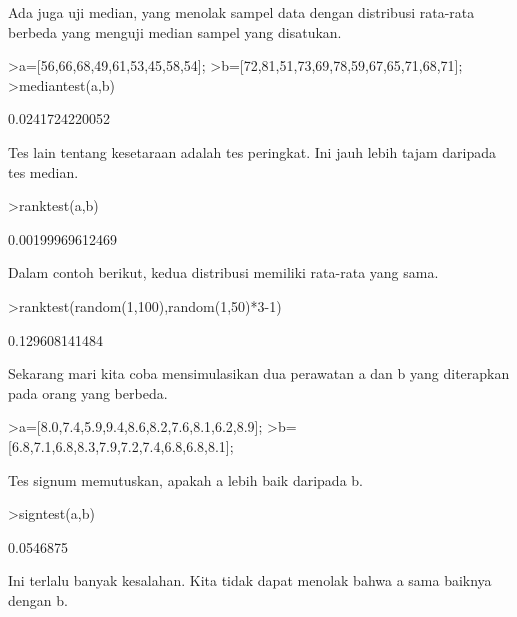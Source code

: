 \documentclass[a4paper,10pt]{article}
\begin{document}
\begin{eulernotebook}
\begin{eulercomment}
\begin{eulercomment}
\begin{eulercomment}
Ada juga uji median, yang menolak sampel data dengan distribusi
rata-rata berbeda yang menguji median sampel yang disatukan.
\end{eulercomment}
\begin{eulerprompt}
>a=[56,66,68,49,61,53,45,58,54];
>b=[72,81,51,73,69,78,59,67,65,71,68,71];
>mediantest(a,b)
\end{eulerprompt}
\begin{euleroutput}
  0.0241724220052
\end{euleroutput}
\begin{eulercomment}
Tes lain tentang kesetaraan adalah tes peringkat. Ini jauh lebih tajam
daripada tes median.
\end{eulercomment}
\begin{eulerprompt}
>ranktest(a,b)
\end{eulerprompt}
\begin{euleroutput}
  0.00199969612469
\end{euleroutput}
\begin{eulercomment}
Dalam contoh berikut, kedua distribusi memiliki rata-rata yang sama.
\end{eulercomment}
\begin{eulerprompt}
>ranktest(random(1,100),random(1,50)*3-1)
\end{eulerprompt}
\begin{euleroutput}
  0.129608141484
\end{euleroutput}
\begin{eulercomment}
Sekarang mari kita coba mensimulasikan dua perawatan a dan b yang
diterapkan pada orang yang berbeda.
\end{eulercomment}
\begin{eulerprompt}
>a=[8.0,7.4,5.9,9.4,8.6,8.2,7.6,8.1,6.2,8.9];
>b=[6.8,7.1,6.8,8.3,7.9,7.2,7.4,6.8,6.8,8.1];
\end{eulerprompt}
\begin{eulercomment}
Tes signum memutuskan, apakah a lebih baik daripada b.
\end{eulercomment}
\begin{eulerprompt}
>signtest(a,b)
\end{eulerprompt}
\begin{euleroutput}
  0.0546875
\end{euleroutput}
\begin{eulercomment}
Ini terlalu banyak kesalahan. Kita tidak dapat menolak bahwa a sama
baiknya dengan b.


\end{eulercomment}
\end{eulercomment}
\end{eulercomment}
\end{eulernotebook}
\end{document}
